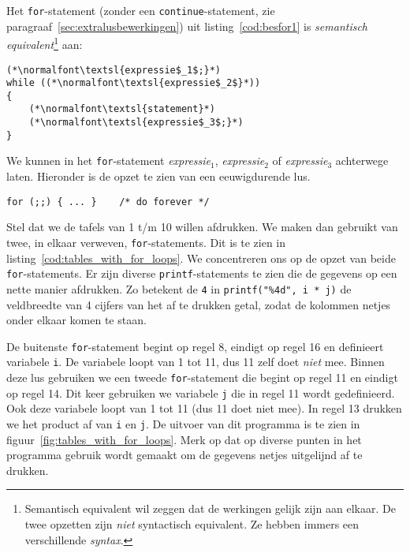 Het \texttt{for}-statement (zonder een \texttt{continue}-statement, zie paragraaf~\ref{sec:extralusbewerkingen}) uit listing~\ref{cod:besfor1} is \textsl{semantisch equivalent}\footnote{Semantisch equivalent wil zeggen dat de werkingen gelijk zijn aan elkaar. De twee opzetten zijn \textsl{niet} syntactisch equivalent. Ze hebben immers een verschillende \textsl{syntax}.} aan:

\begin{lstlisting}[caption=\texttt{while}-statement als \texttt{for}-statement.,label=cod:besforaswhile]
(*\normalfont\textsl{expressie$_1$;}*)
while ((*\normalfont\textsl{expressie$_2$}*))
{
    (*\normalfont\textsl{statement}*)
    (*\normalfont\textsl{expressie$_3$;}*)
}
\end{lstlisting}

We kunnen in het \texttt{for}-statement \textsl{expressie$_1$}, \textsl{expressie$_2$} of \textsl{expressie}$_3$ achterwege laten. Hieronder is de opzet te zien van een eeuwigdurende lus.

\begin{lstlisting}[style=lstoneline]
for (;;) { ... }    /* do forever */
\end{lstlisting}

Stel dat we de tafels van 1 t/m 10 willen afdrukken. We maken dan gebruikt van twee, in elkaar verweven, \texttt{for}-statements. Dit is te zien in listing~\ref{cod:tables_with_for_loops}. We concentreren ons op de opzet van beide \texttt{for}-statements. Er zijn diverse \texttt{printf}-statements te zien die de gegevens op een nette manier afdrukken.
Zo betekent de \texttt{4} in \texttt{printf("\%4d", i * j)} de veldbreedte van 4 cijfers van het af te drukken getal, zodat de kolommen netjes onder elkaar komen te staan.


De buitenste \texttt{for}-statement begint op regel 8, eindigt op regel 16 en definieert variabele \texttt{i}. De variabele loopt van 1 tot 11, dus 11 zelf doet \textsl{niet} mee. Binnen deze lus gebruiken we een tweede \texttt{for}-statement die begint op regel 11 en eindigt op regel 14. Dit keer gebruiken we variabele \texttt{j} die in regel 11 wordt gedefinieerd. Ook deze variabele loopt van 1 tot 11 (dus 11 doet niet mee). In regel 13 drukken we het product af van \texttt{i} en \texttt{j}. De uitvoer van dit programma is te zien in figuur~\ref{fig:tables_with_for_loops}. Merk op dat op diverse punten in het programma gebruik wordt gemaakt om de gegevens netjes uitgelijnd af te drukken.

